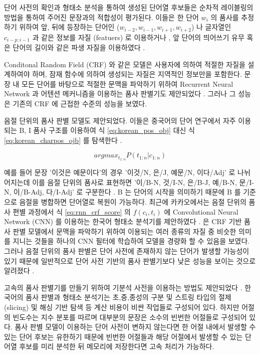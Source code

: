 \documentclass[11pt]{article}
\begin{document}
단어 사전의 확인과 형태소 분석을 통하여 생성된 단어열 후보들은 순차적 레이블링의 방법을 통하여 주어진 문장과의 적합성이 평가된다.
이들은 한 단어 $w_i$ 의 품사를 추정하기 위하여 앞, 뒤에 등장하는 단어인 ($w_{i-2}, w_{i-1}, w_{i+1}, w_{i+2}$) 나 글자열인 $c_{i-p:i-1}$ 과 같은 정보를 자질 (featuers) 로 이용하거나 \cite{lee2013joint}, 앞 단어의 띄어쓰기 유무 혹은 단어의 길이와 같은 파생 자질을 이용하였다 \cite{na2012crfs}.

Conditonal Random Field (CRF) 와 같은 모델은 사용자에 의하여 적절한 자질을 설계하여야 하며, 잠재 함수에 의하여 생성되는 자질은 지역적인 정보만을 포함한다.
문장 내 모든 단어를 바탕으로 적절한 문맥을 파악하기 위하여 Recurrent Neural Network 과 어텐션 메커니즘을 이용하는 품사 판별기도 제안되었다 \cite{lee2016sequence}.
그러나 그 성능은 기존의 CRF 에 근접한 수준의 성능을 보였다.


음절 단위의 품사 판별 모델도 제안되었다.
이들은 중국어의 단어 연구에서 자주 이용되는 B, I 품사 구조를 이용하여 식 \ref{eq:korean_pos_obj} 대신 식 \ref{eq:korean_charpos_ojb} 를 탐색한다 \cite{zhao2006improved}.

\begin{equation}
\label{eq:korean_charpos_ojb}
arg max_{t_{1:n}} P(t_{1:n} \vert c_{1:n})
\end{equation}

예를 들어 문장 '이것은 예문이다'의 경우 '이것/N, 은/J, 예문/N, 이다/Adj' 로 나뉘어지는데 이를 음절 단위의 품사로 표현하면 '이/B-N, 것/I-N, 은/B-J, 예/B-N, 문/I-N, 이/B-Adj, 다/I-Adj' 로 구분한다 \cite{shim2004syllablekor, shim2011morpheme, kim2018bidirectional}.
B 는 단어의 시작을 의미하기 때문에 B 를 기준으로 음절을 병합하면 단어열로 복원이 가능하다.
최근에 카카오에서는 음절 단위의 품사 편별 과정에서 식 \ref{eq:rnn_crf_score} 의 $f(c_i, t_i)$ 에 Convolutional Neural Network (CNN) 를 이용하는 한국어 형태소 분석기를 제안하였다 \cite{kakao2018pos}.
\cite{kakao2018pos} 은 CRF 기반 품사 판별 모델에서 문맥을 파악하기 위하여 이용되는 여러 종류의 자질 중 비슷한 의미를 지니는 것들을 하나의 CNN 필터에 학습하여 모델을 경량화 할 수 있음을 보였다.
그러나 음절 단위의 품사 판별은 단어 사전에 존재하지 않는 단어가 발생할 가능성이 있기 때문에 일반적으로 단어 사전 기반의 품사 판별기보다 낮은 성능을 보이는 것으로 알려졌다 \cite{ng2004chinese, shi2007dual, zhang2008joint, lee2016sequence, kakao2018pos}.

고속의 품사 판별기를 만들기 위하여 기분석 사전을 이용하는 방법도 제안되었다 \cite{lee2016preanalyzed, shim2016preanalyzed}.
한국어의 품사 판별과 형태소 분석기는 초,중,종성의 구분 및 스트링 타입의 절제 (slicing) 및 해싱 기반 탐색 등 계산 비용이 비싼 작업들로 구성되어 있다.
하지만 어절의 빈도수는 지수 분포를 따르며 대부분의 문장은 소수의 빈번한 어절들로 구성되어 있다.
품사 판별 모델이 이용하는 단어 사전이 변하지 않는다면 한 어절 내에서 발생할 수 있는 단어 후보는 유한하기 때문에 빈번한 어절들과 해당 어절에서 발생할 수 있는 단어열 후보를 미리 분석한 뒤 메모리에 저장한다면 고속 처리가 가능하다.
\end{document}
